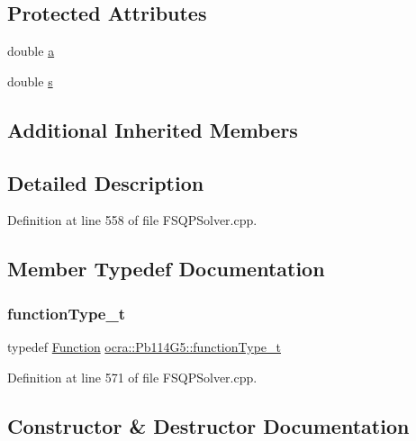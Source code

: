 \subsection*{Protected Attributes}
\begin{DoxyCompactItemize}
\item 
double \hyperlink{classocra_1_1Pb114G5_a36c7950fd1d7556715ae7e0749e88211}{a}
\item 
double \hyperlink{classocra_1_1Pb114G5_a97daa687d5cec8995656fa8787f8a89e}{s}
\end{DoxyCompactItemize}
\subsection*{Additional Inherited Members}


\subsection{Detailed Description}


Definition at line 558 of file F\+S\+Q\+P\+Solver.\+cpp.



\subsection{Member Typedef Documentation}
\hypertarget{classocra_1_1Pb114G5_af9b5d124dfe6eefc49fe0603b948330e}{}\label{classocra_1_1Pb114G5_af9b5d124dfe6eefc49fe0603b948330e} 
\subsubsection{\texorpdfstring{function\+Type\+\_\+t}{functionType\_t}}
{\footnotesize\ttfamily typedef \hyperlink{classocra_1_1Function}{Function} \hyperlink{classocra_1_1Pb114G5_af9b5d124dfe6eefc49fe0603b948330e}{ocra\+::\+Pb114\+G5\+::function\+Type\+\_\+t}}



Definition at line 571 of file F\+S\+Q\+P\+Solver.\+cpp.



\subsection{Constructor \& Destructor Documentation}
\hypertarget{classocra_1_1Pb114G5_a53ef7eb76deed9c8ca148f175f9bb8a6}{}\label{classocra_1_1Pb114G5_a53ef7eb76deed9c8ca148f175f9bb8a6} 
